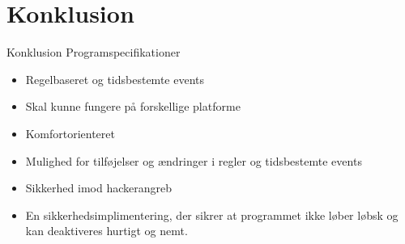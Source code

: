 \section{Konklusion}
\begin{frame}{Konklusion}{}
Programspecifikationer
\begin{itemize}
\item Regelbaseret og tidsbestemte events
\item Skal kunne fungere på forskellige platforme
\item Komfortorienteret
\item Mulighed for tilføjelser og ændringer i regler og tidsbestemte events
\item Sikkerhed imod hackerangreb
\item En sikkerhedsimplimentering, der sikrer at programmet ikke løber løbsk og kan deaktiveres hurtigt og nemt.
\end{itemize}
\end{frame}
